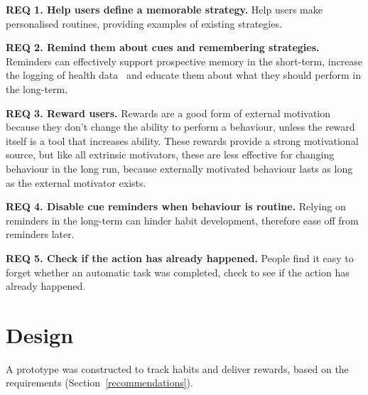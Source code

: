 \textbf{REQ 1. Help users define a memorable strategy.}\newline
Help users make personalised routines, providing examples of existing strategies.

\textbf{REQ 2. Remind them about cues and remembering strategies.}\newline
Reminders can effectively support prospective memory in the short-term, increase the logging of health data~\cite{the_power_of_logging_mobile_notifications} and educate them about what they should perform in the long-term.


\textbf{REQ 3. Reward users.}\newline
Rewards are a good form of external motivation because they don't change the ability to perform a behaviour, unless the reward itself is a tool that increases ability. These rewards provide a strong motivational source, but like all extrinsic motivators, these are less effective for changing behaviour in the long run, because externally motivated behaviour lasts as long as the external motivator exists.


\textbf{REQ 4. Disable cue reminders when behaviour is routine.}\newline
Relying on reminders in the long-term can hinder habit development, therefore ease off from reminders later.


\textbf{REQ 5. Check if the action has already happened.}\newline
People find it easy to forget whether an automatic task was completed, check to see if the action has already happened.


\newpage
\section{Design}
A prototype was constructed to track habits and deliver rewards, based on the requirements (Section~\ref{recommendations}).


